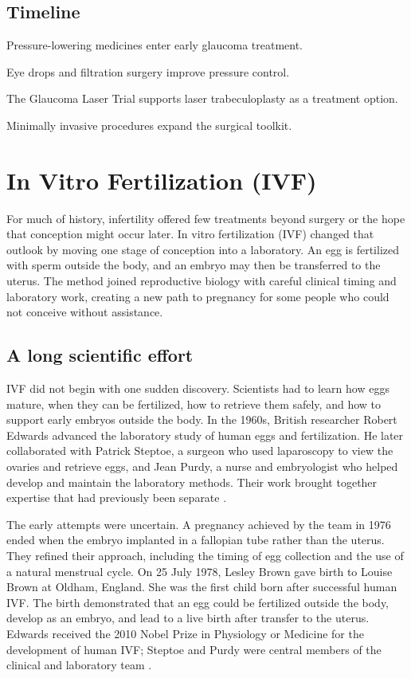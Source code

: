 \documentclass[12pt,oneside]{book}
\begin{document}
\section*{Timeline}
\begin{description}[leftmargin=2.3cm,style=nextline]
  \item[1860s] Pressure-lowering medicines enter early glaucoma treatment.
  \item[Twentieth century] Eye drops and filtration surgery improve pressure control.
  \item[1990] The Glaucoma Laser Trial supports laser trabeculoplasty as a treatment option.
  \item[Twenty-first century] Minimally invasive procedures expand the surgical toolkit.
\end{description}
\chapter[In Vitro Fertilization (IVF)]{In Vitro Fertilization (IVF)}

For much of history, infertility offered few treatments beyond surgery or
the hope that conception might occur later. In vitro fertilization (IVF)
changed that outlook by moving one stage of conception into a laboratory.
An egg is fertilized with sperm outside the body, and an embryo may then be
transferred to the uterus. The method joined reproductive biology with
careful clinical timing and laboratory work, creating a new path to
pregnancy for some people who could not conceive without assistance.

\section{A long scientific effort}
IVF did not begin with one sudden discovery. Scientists had to learn how
eggs mature, when they can be fertilized, how to retrieve them safely, and
how to support early embryos outside the body. In the 1960s, British
researcher Robert Edwards advanced the laboratory study of human eggs and
fertilization. He later collaborated with Patrick Steptoe, a surgeon who
used laparoscopy to view the ovaries and retrieve eggs, and Jean Purdy, a
nurse and embryologist who helped develop and maintain the laboratory
methods. Their work brought together expertise that had previously been
separate \cite{nobelIVF}.

The early attempts were uncertain. A pregnancy achieved by the team in
1976 ended when the embryo implanted in a fallopian tube rather than the
uterus. They refined their approach, including the timing of egg collection
and the use of a natural menstrual cycle. On 25 July 1978, Lesley Brown gave
birth to Louise Brown at Oldham, England. She was the first child born after
successful human IVF. The birth demonstrated that an egg could be fertilized
outside the body, develop as an embryo, and lead to a live birth after
transfer to the uterus. Edwards received the 2010 Nobel Prize in Physiology
or Medicine for the development of human IVF; Steptoe and Purdy were central
members of the clinical and laboratory team
\cite{nobelIVF,ivfHistoryReview}.
\end{document}
